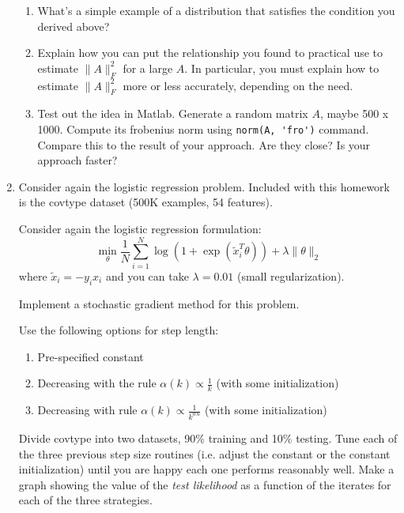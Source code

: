 \documentclass[12pt]{amsart}
\begin{document}
\begin{enumerate}
\begin{enumerate}
\item What's a simple example of a distribution that satisfies the condition you derived above? \\

\item Explain how you can put the relationship you found to practical use to estimate $\|A\|_F^2$ for a large $A$. 
In particular, you must explain how to estimate $\|A\|_F^2$ more or less accurately, depending on the need. \\

\item Test out the idea in Matlab. Generate a random matrix $A$, maybe 500 x 1000. Compute its frobenius norm
using \verb{norm(A, 'fro'){ command.  Compare this to the result of your approach. Are they close? Is your approach faster? \\

\end{enumerate}




\item Consider again the logistic regression problem. 
Included with this homework is the covtype dataset (500K examples, 54 features). 

Consider again the logistic regression formulation:
\[
\min_\theta \frac{1}{N}\sum_{i=1}^N \log(1+\exp(\tilde x_i^T \theta)) + \lambda\|\theta\|_2
\]
where $\tilde x_i = -y_i x_i$ and you can take $\lambda = 0.01$ (small regularization). 

Implement a stochastic gradient method for this problem. 

Use the following options for step length:
\begin{enumerate}
\item Pre-specified constant 
\item Decreasing with the rule $\alpha(k) \propto \frac{1}{k}$ (with some initialization)
\item Decreasing with rule $\alpha(k) \propto \frac{1}{k^{0.6}}$ (with some initialization) \\
\end{enumerate}

Divide covtype into two datasets, 90\% training and 10\% testing. Tune each of the three previous step size routines 
(i.e. adjust the constant or the constant initialization) until you are happy each one performs reasonably well. 
Make a graph showing the value of the {\it test likelihood} as a function of the iterates for each of the three strategies. \\



\end{enumerate}
\end{document}
